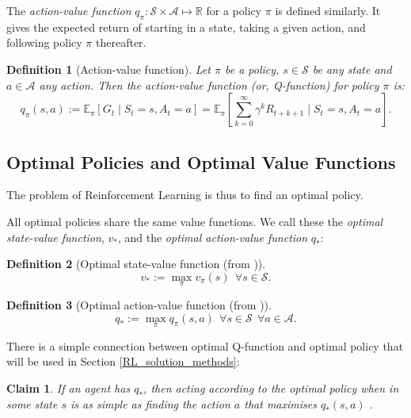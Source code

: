 \documentclass[11pt, a4paper, bibliography=totoc]{report}
\newcommand{\reals}{\mathbb{R}}
\newcommand{\E}[2]{\mathbb{E}_{#1} \left[ #2 \right] }
\newtheorem{claim}{Claim}
\newtheorem{definition}{Definition}
\begin{document}
The \textit{action-value function} $ q_\pi : \mathcal{S} \times \mathcal{A} \mapsto \reals $ for a policy $ \pi $ is defined similarly. It gives the expected return of starting in a state, taking a given action, and following policy $ \pi $ thereafter.
\begin{definition}[Action-value function]
	Let $ \pi $ be a policy, $ s \in \mathcal{S} $ be any state and $ a \in \mathcal{A} $ any action. Then the action-value function (or, Q-function) for policy $ \pi $ is:
	\begin{equation} \label{v_pi}
	q_\pi(s, a) := \E{\pi}{G_t \mid S_t = s, A_t = a} = \E{\pi}{\sum_{k=0}^{\infty} \gamma^k R_{t+k+1} \mid S_t = s, A_t = a}.
	\end{equation}
\end{definition}

\subsection{Optimal Policies and Optimal Value Functions} \label{optimal_policy_value_functions}
The problem of Reinforcement Learning is thus to find an optimal policy.

All optimal policies share the same value functions. We call these the \textit{optimal state-value function}, $ v_* $, and the \textit{optimal action-value function} $ q_* $:
\begin{definition}[Optimal state-value function (from {\cite[p.~62]{Sutton2018}})]
	$$ v_*  := \max_\pi v_\pi(s) ~~ \forall s \in \mathcal{S} .$$
\end{definition}
\begin{definition}[Optimal action-value function (from {\cite[p.~63]{Sutton2018}})]
	$$ q_*  := \max_\pi q_\pi(s,a) ~~ \forall s \in \mathcal{S} ~~ \forall a \in \mathcal{A} .$$
\end{definition}

There is a simple connection between optimal Q-function and optimal policy that will be used in Section \ref{RL_solution_methods}:
\begin{claim} \label{Q_claim}
	If an agent has $ q_* $, then acting according to the optimal policy when in some state $ s $ is as simple as finding the action $ a $ that maximises $ q_*(s,a) $ \cite[p.~64]{Sutton2018}.
\end{claim}
\end{document}
